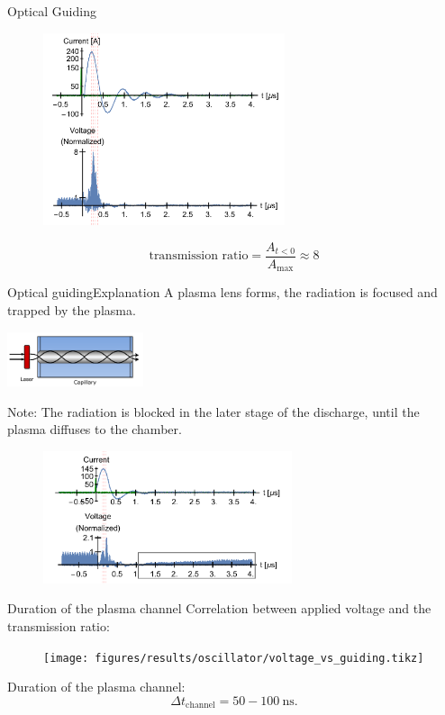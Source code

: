 \documentclass[dvipsnames]{beamer}
\begin{document}
 \begin{frame}{Optical Guiding}
   \begin{figure}
     \includegraphics[height=160pt]{figures/results/oscillator/guiding2.pdf}
   \end{figure}
   \begin{equation*}
     \text{transmission ratio} = \frac{A_{t<0}}{A_\text{max}} \approx 8
   \end{equation*}
 \end{frame}
\begin{frame}{Optical guiding}{Explanation}
  {\footnotesize A plasma lens forms, the radiation is focused and trapped by the plasma.}
  \begin{center}
    \includegraphics[width=0.3\textwidth]{figures/results/oscillator/chen_4_31.pdf}
  \end{center}
  {\footnotesize Note: The radiation is blocked in the later stage of the discharge, until the plasma diffuses to the chamber.}
  \begin{figure}
    \includegraphics[width=0.65\textwidth]{figures/results/oscillator/guiding_gray.pdf}
  \end{figure}
\end{frame}
\begin{frame}{Duration of the plasma channel}
Correlation between applied voltage and the transmission ratio:
\begin{figure}
\texttt{[image: figures/results/oscillator/voltage\_vs\_guiding.tikz]}
\end{figure}
Duration of the plasma channel:
 \begin{equation*}
  \Delta t_\text{channel}=50 -100\ \si{\ns}.
 \end{equation*}
\end{frame}
\end{document}
